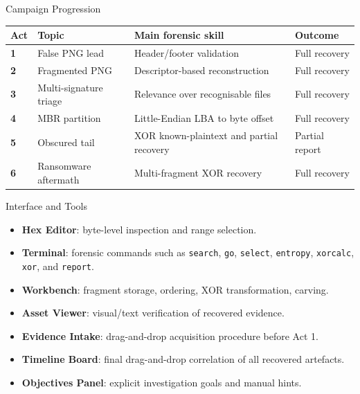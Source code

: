 \documentclass[aspectratio=169]{beamer}
\begin{document}
\begin{frame}{Campaign Progression}
  \small
  \setlength{\tabcolsep}{3pt}
  \begin{tabular}{@{}>{\bfseries}p{}p{}p{}p{}@{}}
    \toprule
    Act & Topic & Main forensic skill & Outcome \\
    \midrule
    1 & False PNG lead & Header/footer validation & Full recovery \\
    2 & Fragmented PNG & Descriptor-based reconstruction & Full recovery \\
    3 & Multi-signature triage & Relevance over recognisable files & Full recovery \\
    4 & MBR partition & Little-Endian LBA to byte offset & Full recovery \\
    5 & Obscured tail & XOR known-plaintext and partial recovery & Partial report \\
    6 & Ransomware aftermath & Multi-fragment XOR recovery & Full recovery \\
    \bottomrule
  \end{tabular}
\end{frame}

\begin{frame}{Interface and Tools}
  \begin{itemize}
    \item \textbf{Hex Editor}: byte-level inspection and range selection.
    \item \textbf{Terminal}: forensic commands such as \texttt{search}, \texttt{go},
      \texttt{select}, \texttt{entropy}, \texttt{xorcalc}, \texttt{xor}, and \texttt{report}.
    \item \textbf{Workbench}: fragment storage, ordering, XOR transformation, carving.
    \item \textbf{Asset Viewer}: visual/text verification of recovered evidence.
    \item \textbf{Evidence Intake}: drag-and-drop acquisition procedure before Act 1.
    \item \textbf{Timeline Board}: final drag-and-drop correlation of all recovered artefacts.
    \item \textbf{Objectives Panel}: explicit investigation goals and manual hints.
  \end{itemize}
\end{frame}
\end{document}
